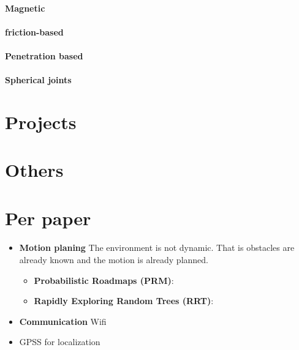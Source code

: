 \documentclass{article}
\begin{document}
		\paragraph{Magnetic}
			\cite{loianno-2017-cooperative-transportation-using-small-quadrotors-using-monocular-vision-and-inertial-sensing}
			\cite{mellinger-2010-cooperative-grasping-and-transport-using-multiple-quadrotors}
		\paragraph{friction-based}
		\paragraph{Penetration based}
		\paragraph{Spherical joints}
			\cite{tagliabue-2017-robust-collaborative-object-transportation-using-multiple-mavs}
	
	\section{Projects}
		\cite{ollero-2018-the-aeroarms-project-aerial-robots-with-advanced-manipulation-capabilities-for-inspection-and-maintenance}
	\section{Others}
	\section{Per paper}
		\paragraph{\cite{spurny-2019-cooperative-transport-of-large-objects-by-a-pair-of-unmanned-aerial-systems-using-sampling-based-motion-planning}}
			\begin{itemize}
				\item \textbf{Motion planing} The environment is not dynamic. That is obstacles are already known and the motion is already planned.
					\begin{itemize}
						\item \textbf{Probabilistic Roadmaps (PRM)}: \cite{lavalle-1998-rapidly-exploring-random-trees-a-new-tool-for-path-planning}
						\item \textbf{Rapidly Exploring Random Trees (RRT)}: \cite{kavraki-1996-probabilistic-roadmaps-for-path-planning-in-high-dimensional-configuration-spaces}
					\end{itemize}
				\item \textbf{Communication} Wifi
				\item GPSS for localization
			\end{itemize}
\end{document}
